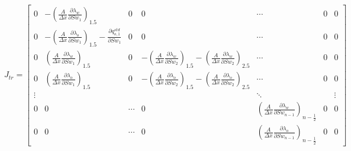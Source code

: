 \documentclass[final,5p]{elsarticle}
\numberwithin{equation}{section}
\begin{document}
        \begin{figure*}
            \begin{equation}
                J_{tr} =
                \begin{bmatrix}
                        0 &  -\left( \frac{A}{\Delta x} \frac{\partial \lambda_w}{\partial Sw_1} \right)_{1.5} & 0 & 0 & \cdots & 0 & 0 \\
                        0 &  -\left( \frac{A}{\Delta x} \frac{\partial \lambda_o}{\partial Sw_1} \right)_{1.5} - \frac{\partial q^{std}_{o,1}}{\partial Sw_1} & 0 & 0 & \cdots & 0 & 0 \\

                        0 & \left( \frac{A}{\Delta x} \frac{\partial \lambda_w}{\partial Sw_1} \right)_{1.5} & 0 & -\left( \frac{A}{\Delta x} \frac{\partial \lambda_w}{\partial Sw_2} \right)_{1.5}-\left( \frac{A}{\Delta x} \frac{\partial \lambda_w}{\partial Sw_2} \right)_{2.5} & \cdots & 0 & 0 \\
                        0 & \left( \frac{A}{\Delta x} \frac{\partial \lambda_o}{\partial Sw_1} \right)_{1.5} & 0 & -\left( \frac{A}{\Delta x} \frac{\partial \lambda_o}{\partial Sw_2} \right)_{1.5}-\left( \frac{A}{\Delta x} \frac{\partial \lambda_o}{\partial Sw_2} \right)_{2.5} & \cdots & 0 & 0 \\

                        \vdots     &     &      &  & \ddots &  & \vdots \\
                        0 & 0 & \cdots & 0 &  \left( \frac{A}{\Delta x} \frac{\partial \lambda_w}{\partial Sw_{n-1}} \right)_{n-\frac{1}{2}} & 0 & 0 \\
                        0 & 0 & \cdots & 0 &  \left( \frac{A}{\Delta x} \frac{\partial \lambda_o}{\partial Sw_{n-1}} \right)_{n-\frac{1}{2}} & 0 & 0
                \end{bmatrix}
                \label{eq:sistemajactr}
            \end{equation}
            \end{figure*}
\end{document}
